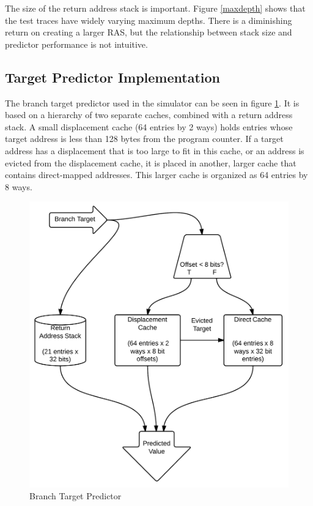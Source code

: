 \documentclass[twocolumn]{article}
\newcommand{\centerimage}[3]{
\begin{figure}[ht!]  
\begin{center} #1
\caption{#2}
\label{#3}
\end{center}
\end{figure}}
\begin{document}
The size of the return address stack is important. Figure
\ref{maxdepth} shows that the test traces have widely varying maximum
depths. There is a diminishing return on creating a larger RAS, but
the relationship between stack size and predictor performance is not
intuitive.

\subsection{Target Predictor Implementation}

The branch target predictor used in the simulator can be seen in
figure \ref{btbshape}. It is based on a hierarchy of two separate
caches, combined with a return address stack. A small displacement
cache (64 entries by 2 ways) holds entries whose target address is
less than 128 bytes from the program counter. If a target address has
a displacement that is too large to fit in this cache, or an address
is evicted from the displacement cache, it is placed in another,
larger cache that contains direct-mapped addresses. This larger cache
is organized as 64 entries by 8 ways.

\centerimage{\includegraphics[width=\columnwidth]{BTB.png}}{Branch
  Target Predictor}{btbshape}
\end{document}
